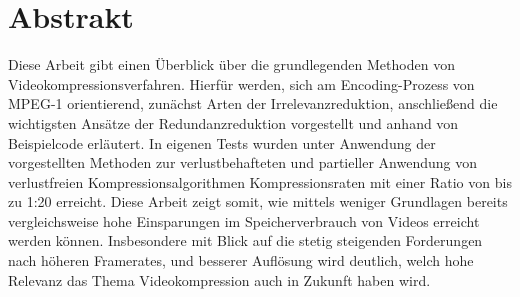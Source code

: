 \chapter{Abstrakt}
Diese Arbeit gibt einen Überblick über die grundlegenden Methoden von Videokompressionsverfahren. Hierfür werden, sich am Encoding-Prozess von MPEG-1 orientierend, zunächst Arten der Irrelevanzreduktion, anschließend die wichtigsten Ansätze der Redundanzreduktion vorgestellt und anhand von Beispielcode erläutert. In eigenen Tests wurden unter Anwendung der vorgestellten Methoden zur verlustbehafteten und partieller Anwendung von verlustfreien Kompressionsalgorithmen Kompressionsraten mit einer Ratio von bis zu 1:20 erreicht. Diese Arbeit zeigt somit, wie mittels weniger Grundlagen bereits vergleichsweise hohe Einsparungen im Speicherverbrauch von Videos erreicht werden können. Insbesondere mit Blick auf die stetig steigenden Forderungen nach höheren Framerates, und besserer Auflösung wird deutlich, welch hohe Relevanz das Thema Videokompression auch in Zukunft haben wird.
